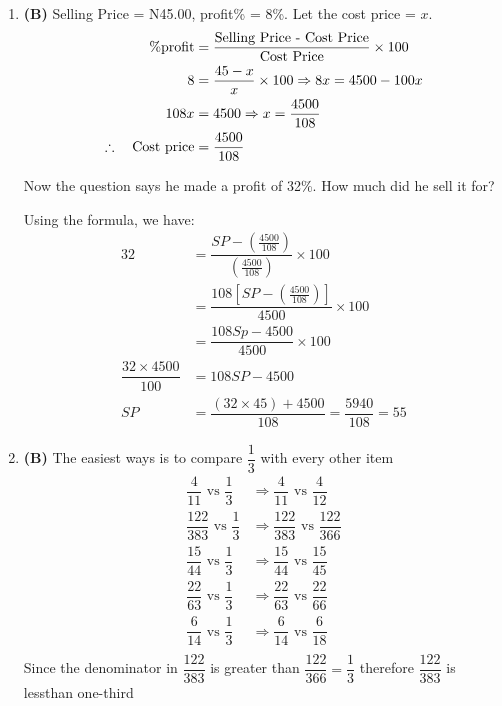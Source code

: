 \begin{multicols}{2}
\begin{enumerate}[label={\textbf{\arabic*.}}]
    \item \textbf{(B)} Selling Price = N45.00, profit\% = 8\%.
    Let the cost price = \(x\).
    \begin{align*}
    \%\text{profit} &= \frac{\text{Selling Price - Cost Price}}{\text{Cost Price}} \times 100 \\
    8 &= \frac{45 - x}{x} \times 100 \Rightarrow 8x = 4500 - 100x \\
    108x &= 4500 \Rightarrow x = \dfrac{4500}{108} \\
    \therefore \hspace{10px} \text{Cost price} &= \dfrac{4500}{108}
    \end{align*}
    
    Now the question says he made a profit of 32\%. How much did he sell it for?
    
    Using the formula, we have:
    \begin{align*}
    32 &= \dfrac{SP - \left(\frac{4500}{108}\right)}{\left(\frac{4500}{108}\right)} \times 100 \\
    &= \dfrac{108\left[SP - \left(\frac{4500}{108}\right)\right]}{4500} \times 100 \\
    &= \dfrac{108Sp - 4500}{4500} \times 100 \\
    \dfrac{32 \times 4500}{100} &= 108SP - 4500 \\
    SP &= \dfrac{(32 \times 45) + 4500}{108} = \dfrac{5940}{108} = 55
    \end{align*}


    \item \textbf{(B) }The easiest ways is to compare $\dfrac{1}{3}$ with every other item \\
        \begin{align*}
            \dfrac{4}{11} \text{ vs } \dfrac{1}{3} &\Rightarrow \dfrac{4}{11} \text{ vs } \dfrac{4}{12} \\
            \dfrac{122}{383} \text{ vs } \dfrac{1}{3} &\Rightarrow \dfrac{122}{383} \text{ vs } \dfrac{122}{366} \\
            \dfrac{15}{44} \text{ vs } \dfrac{1}{3} &\Rightarrow \dfrac{15}{44} \text{ vs } \dfrac{15}{45} \\
            \dfrac{22}{63} \text{ vs } \dfrac{1}{3} &\Rightarrow \dfrac{22}{63} \text{ vs } \dfrac{22}{66} \\
            \dfrac{6}{14} \text{ vs } \dfrac{1}{3} &\Rightarrow \dfrac{6}{14} \text{ vs } \dfrac{6}{18} \\
        \end{align*}
        Since the denominator in $\dfrac{122}{383}$ is greater than $\dfrac{122}{366} = \dfrac{1}{3}$ therefore $\dfrac{122}{383}$ is lessthan one-third


\end{enumerate}
\end{multicols}
